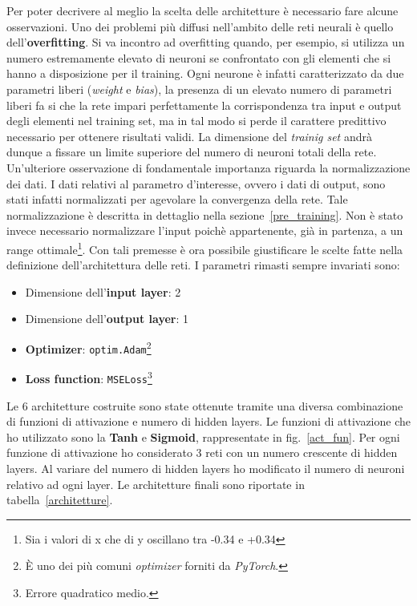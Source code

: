 \documentclass[12pt,a4paper,final]{book}
\begin{document}
Per poter decrivere al meglio la scelta delle architetture è necessario fare alcune osservazioni.
Uno dei problemi più diffusi nell'ambito delle reti neurali è quello dell'\textbf{overfitting}. Si va incontro ad overfitting quando, per esempio, si utilizza un numero estremamente elevato di neuroni se confrontato con gli elementi che si hanno a disposizione per il training.
Ogni neurone è infatti caratterizzato da due parametri liberi (\textit{weight} e \textit{bias}), la presenza di un elevato numero di parametri liberi fa si che la rete impari perfettamente la corrispondenza tra input e output degli elementi nel training set, ma in tal modo si perde il carattere predittivo necessario per ottenere risultati validi. La dimensione del \textit{trainig set} andrà dunque a fissare un limite superiore del numero di neuroni totali della rete.
Un'ulteriore osservazione di fondamentale importanza riguarda la normalizzazione dei dati. I dati relativi al parametro d'interesse, ovvero i dati di output, sono stati infatti normalizzati per agevolare la convergenza della rete. Tale normalizzazione è descritta in dettaglio nella sezione~\ref{pre_training}.
Non è stato invece necessario normalizzare l'input poichè appartenente, già in partenza, a un range ottimale\footnote{Sia i valori di x che di y oscillano tra -0.34 e +0.34}.
Con tali premesse è ora possibile giustificare le scelte fatte nella definizione dell'architettura delle reti. I parametri rimasti sempre invariati sono:
\begin{itemize}
	\item Dimensione dell'\textbf{input layer}: 2
	\item Dimensione dell'\textbf{output layer}: 1
	\item \textbf{Optimizer}: \texttt{optim.Adam}\footnote{\`E uno dei più comuni \textit{optimizer} forniti da \textit{PyTorch}.}
	\item \textbf{Loss function}: \texttt{MSELoss}\footnote{Errore quadratico medio.}
\end{itemize}
Le 6 architetture costruite sono state ottenute tramite una diversa combinazione di funzioni di attivazione e numero di hidden layers. Le funzioni di attivazione che ho utilizzato sono la \textbf{Tanh} e \textbf{Sigmoid}, rappresentate in fig.~\ref{act_fun}. Per ogni funzione di attivazione ho considerato 3 reti con un numero crescente di hidden layers. Al variare del numero di hidden layers ho modificato il numero di neuroni relativo ad ogni layer. Le architetture finali sono riportate in tabella~\ref{architetture}.
\end{document}
